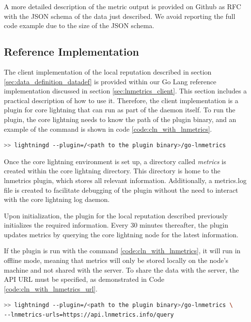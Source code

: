 A more detailed description of the metric output is provided on Github as RFC with 
the JSON schema of the data just described. We avoid reporting the full code example 
due to the size of the JSON schema.

\subsection{Reference Implementation}

The client implementation of the local reputation described in section \ref{sec:data_definition_datadef} 
is provided within our Go Lang reference implementation discussed in section \ref{sec:lnmetrics_client}. 
This section includes a practical description of how to use it. Therefore, the client implementation is 
a plugin for core lightning that can run as part of the daemon itself. To run the plugin, the core lightning 
needs to know the path of the plugin binary, and an example of the command is shown in
code \ref{code:cln_with_lnmetrics}.

\begin{lstlisting}[language=bash, basicstyle=\small,
                  caption={Command to run the core lightning daemon with the lnmetrics plugin enabled.}, 
                  label={code:cln_with_lnmetrics}]
>> lightningd --plugin=/<path to the plugin binary>/go-lnmetrics
\end{lstlisting}

Once the core lightning environment is set up, a directory called \emph{metrics} 
is created within the core lightning directory. This directory is home to the 
lnmetrics plugin, which stores all relevant information. Additionally, a metrics.log 
file is created to facilitate debugging of the plugin without the need to 
interact with the core lightning log daemon.

Upon initialization, the plugin for the local reputation described previously 
initializes the required information. Every 30 minutes thereafter, the plugin
updates metrics by querying the core lightning node for the latest information.

If the plugin is run with the command \ref{code:cln_with_lnmetrics}, it will run
in offline mode, meaning that metrics will only be stored locally on the node's 
machine and not shared with the server. To share the data with the server, the 
API URL must be specified, as demonstrated in Code \ref{code:cln_with_lnmetrics_url}.

\begin{lstlisting}[language=bash, basicstyle=\small,
                  caption={Command to run core lightning with the lnmetrics plugin an publish the data.}, 
                  label={code:cln_with_lnmetrics_url}]
>> lightningd --plugin=/<path to the plugin binary>/go-lnmetrics \ 
--lnmetrics-urls=https://api.lnmetrics.info/query
\end{lstlisting}

